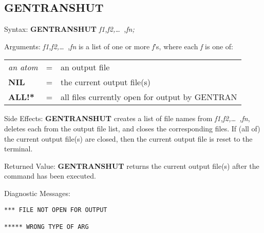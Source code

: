\subsection{GENTRANSHUT}
\begin{describe}{Syntax:}
{\bf GENTRANSHUT} {\it  f1,f2,\dots\ ,fn;\/}
\end{describe}
\begin{describe}{Arguments:}
{\it f1,f2,\dots\ ,fn\/} is a list of one or more {\it f\/}'s, where each 
{\it f\/} is one of:
\begin{center}
\begin{tabular}{lll}
{\it an atom} & = & an output file\\
{\bf NIL} & = & the current output file(s)\\
{\bf ALL!*} & = & all files currently open for output by GENTRAN\\
\end{tabular}
\end{center}
\end{describe}
\begin{describe}{Side Effects:}
{\bf GENTRANSHUT} creates a list of file names from {\it f1,f2,\dots\ ,fn},
deletes each from the output file list, and closes the
corresponding files.  If (all of) the current output file(s) are
closed, then the current output file is reset to the terminal.
\end{describe}
\begin{describe}{Returned Value:}
{\bf GENTRANSHUT} returns the current output file(s) after the command has
been executed.
\end{describe}
\begin{describe}{Diagnostic Messages:}
\begin{verbatim}
*** FILE NOT OPEN FOR OUTPUT

***** WRONG TYPE OF ARG
\end{verbatim}
\end{describe}

